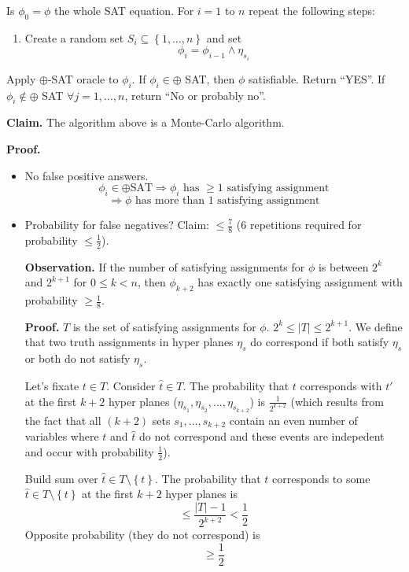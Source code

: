 \documentclass[a4paper]{article}
\newcommand{\set}[1]{\left\{#1\right\}}
\begin{document}
Is $\phi_0 = \phi$ the whole SAT equation. For $i=1$ to $n$ repeat the following
steps:
\begin{enumerate}
  \item Create a random set $S_i \subseteq \set{1, \ldots, n}$ and set
    \[
      \phi_i = \phi_{i-1} \land \eta_{s_i}
    \]
\end{enumerate}

Apply $\oplus$-SAT oracle to $\phi_i$. If $\phi_i \in \oplus$ SAT,
then $\phi$ satisfiable. Return ``YES''.
If $\phi_i \notin \oplus$ SAT $\forall j = 1, \ldots, n$,
return ``No or probably no''.

\textbf{Claim.}
The algorithm above is a Monte-Carlo algorithm.

\textbf{Proof.}
\begin{itemize}
  \item No false positive answers.
    \[
      \phi_i \in \oplus \text{SAT} \Rightarrow \phi_i \text{ has } \geq 1 \text{ satisfying assignment}
    \] \[
      \Rightarrow \phi \text{ has more than 1 satisfying assignment}
    \]
  \item
    Probability for false negatives? Claim: $\leq \frac78$
    (6 repetitions required for probability $\leq \frac12$).

    \textbf{Observation.}
    If the number of satisfying assignments for $\phi$ is
    between $2^k$ and $2^{k+1}$ for $0 \leq k < n$, then
    $\phi_{k+2}$ has exactly one satisfying assignment with
    probability $\geq \frac18$.

    \textbf{Proof.}
    $T$ is the set of satisfying assignments for $\phi$.
    $2^k \leq |T| \leq 2^{k+1}$. We define that two truth
    assignments in hyper planes $\eta_s$ do correspond if
    both satisfy $\eta_s$ or both do not satisfy $\eta_s$.

    Let's fixate $t \in T$. Consider $\hat{t} \in T$.
    The probability that $t$ corresponds with $t'$ at the
    first $k+2$ hyper planes
    ($\eta_{s_1}, \eta_{s_2}, \ldots, \eta_{s_{k+2}}$) is
    $\frac{1}{2^{k+2}}$ (which results from the fact that
    all $(k+2)$ sets $s_1, \ldots, s_{k+2}$ contain an even
    number of variables where $t$ and $\hat{t}$ do not correspond
    and these events are indepedent and occur with probability
    $\frac12$).

    Build sum over $\hat{t} \in T\setminus \set{t}$.
    The probability that $t$ corresponds to some $\hat{t} \in
    T \setminus \set{t}$ at the first $k+2$ hyper planes is
    \[
      \leq \frac{|T| - 1}{2^{k+2}} < \frac12
    \]
    Opposite probability (they do not correspond) is
    \[
      \geq \frac12
    \]


\end{itemize}
\end{document}
